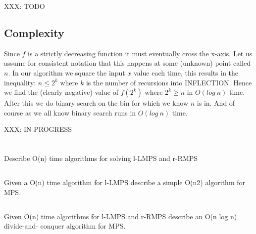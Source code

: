 \documentclass{amsart}
\theoremstyle{definition}
\theoremstyle{remark}
\numberwithin{equation}{section}
\begin{document}
\proof
XXX: TODO


\subsection{Complexity}

Since $f$ is a strictly decreasing function it must eventually cross the
x-axis. Let us assume for consistent notation that this happens at some
(unknown) point called $n$. In our algorithm we square the input $x$
value each time, this results in the inequality: $n \leq 2^k$ where $k$
is the number of recursions into INFLECTION. Hence we find the (clearly
negative) value of $f(2^k)$ where $2^k \geq n$ in $O(log\ n)$ time.
After this we do binary search on the bin for which we know $n$ is in.
And of course as we all know binary search runs in $O( log\ n )$ time.


XXX: IN PROGRESS
\section{}

\subsection{} Describe O(n) time algorithms for solving l-LMPS and r-RMPS

\subsection{} Given a O(n) time algorithm for l-LMPS describe a simple O(n2) algorithm for MPS.

\subsection{} Given O(n) time algorithms for l-LMPS and r-RMPS describe an O(n log n) divide-and- conquer algorithm for MPS.
\end{document}
